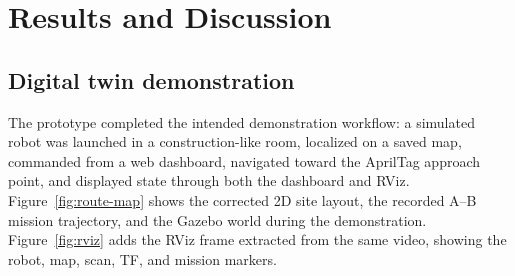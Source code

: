 \documentclass[12pt,a4paper]{article}
\begin{document}
\section{Results and Discussion}

\subsection{Digital twin demonstration}

The prototype completed the intended demonstration workflow: a simulated robot was launched in a construction-like room, localized on a saved map, commanded from a web dashboard, navigated toward the AprilTag approach point, and displayed state through both the dashboard and RViz. Figure~\ref{fig:route-map} shows the corrected 2D site layout, the recorded A--B mission trajectory, and the Gazebo world during the demonstration. Figure~\ref{fig:rviz} adds the RViz frame extracted from the same video, showing the robot, map, scan, TF, and mission markers.
\end{document}

